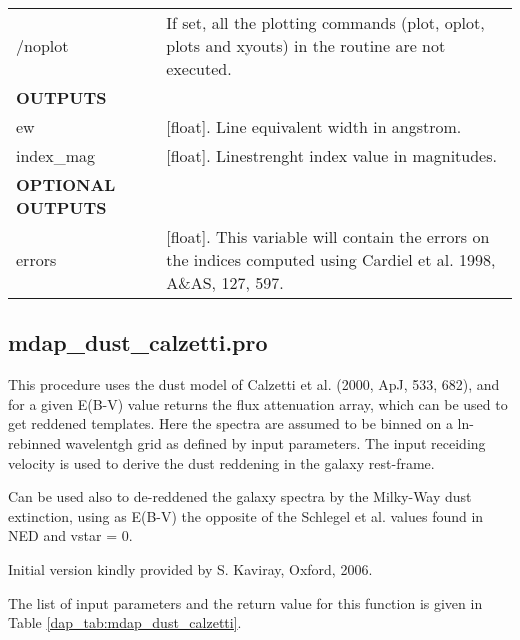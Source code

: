 \documentclass[11pt]{book}
\begin{document}
\begin{center}
\begin{longtable}{p{2.7cm}| p{11.1cm}}
/noplot     &         If set, all the plotting commands (plot, oplot, plots and xyouts) in the routine are not executed.\\
{\bf OUTPUTS} & \\
ew         &[float].    Line equivalent width in angstrom.\\
%
index\_mag &[float].    Linestrenght index value in magnitudes.\\
%
\hline
{\bf OPTIONAL OUTPUTS} & \\
errors    &[float].    This variable will contain the errors on the indices computed using Cardiel et al. 1998, A\&AS, 127, 597.\\
\hline
\end{longtable}
\end{center}







\subsection{{mdap\_dust\_calzetti.pro}}
\label{dap_sec:mdap_do_measure_indices}  



This procedure uses the dust model of Calzetti et al. (2000, ApJ, 533,
682), and for a given E(B-V) value returns the flux attenuation array,
which can be used to get reddened templates. Here the spectra are
assumed to be binned on a ln-rebinned wavelentgh grid as defined by
input parameters. The input receiding velocity is used to derive the
dust reddening in the galaxy rest-frame.

Can be used also to de-reddened the galaxy spectra by the Milky-Way
dust extinction, using as E(B-V) the opposite of the Schlegel et
al. values found in NED and vstar = 0.

Initial version kindly provided by S. Kaviray, Oxford, 2006.

The list of input parameters and the return value for this function is
given in Table \ref{dap_tab:mdap_dust_calzetti}.
\end{document}
